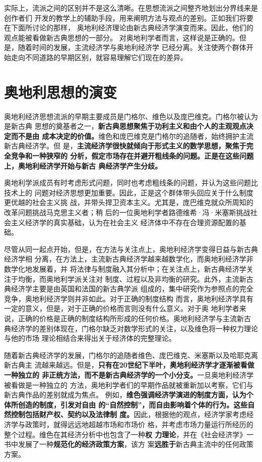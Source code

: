 实际上，流派之间的区别并不是这么清晰。在思想流派之间整齐地划出分界线来是创作者们
开发的教学上的辅助手段，用来阐明方法与观点的差别。正如我们将要在下面所讨论的那样，
奥地利经济理论由新古典经济学演变而来。因此，他们的观点能被看做新古典思想的一部分。
对奥地利学者而言，这样说是正确的。但是，随着时间的发展，主流经济学与奥地利经济学
已经分离。关注使两个群体开始走向不同道路的早期区别，就容易理解它们现在的差异。

\section{奥地利思想的演变}

奥地利经济思想流派的早期主要成员是门格尔、维色以及庞巴维克。门格尔被认为是新古典
思想的奠基者之一，\textbf{新古典思想聚焦于功利主义和由个人的主观观点决定而不是由
  成本决定的价值。}维色和庞巴维克是门格尔的追随者，始终拥护主流新古典经济学。但
是，\textbf{主流经济学很快就倾向于形式主义的数学思想，聚焦于完全竞争和一种狭窄的
  分析，假定市场存在并避开粗线条的问题。正是在这些问题上，奥地利经济学开始与新古
  典经济学产生分歧。}

奥地利学派成员有时考虑形式问题，同时也考虑粗线条的问题，并认为这些问题比技术上的
问题对经济思想更加重要。因此，正是这个群体带头回应关于什么制度更优越的社会主义挑
战，并带头捍卫资本主义。尤其是，庞巴维克就众所周知的改革问题挑战马克思主义者；稍
后的一位奥地利学者路德维希·冯·米塞斯挑战社会主义经济学的真实基础，认为在社会主义
经济体中不存在合理资源配置的基础。

尽管从同一起点开始，但是，在方法与关注点上，奥地利经济学变得日益与新古典经济学相
分离，在方法上，主流新古典经济学越来越数学化，而奥地利经济学非数学化地发展着，并
将法律与制度融入其分析中；在关注点上，新古典经济学关注于均衡，而奥地利学派关注对
制度、过程以及非均衡的研究。此外，主流新古典经济学主要是由英国和法国的新古典学派
组成的，集中研究作为参照点的完全竞争，奥地利经济学则并非如此。对于正确的制度结构
而言，奥地利经济学具有一定的意义，但是，对于正确的价格而言则没有什么意义。对于奥
地利学者来说，正确的价格是正确的制度结构所形成的任何价格。奥地利经济学与主流新古
典经济学的差别体现在，门格尔缺乏对数学形式的关注，以及维色将一种权力理论与他的市场
理论相结合来得出关于经济体的完整理论。

随着新古典经济学的发展，门格尔的追随者维色、庞巴维克、米塞斯以及哈耶克离新古典主
流越来越远。但是，\textbf{只有在20世纪下半叶，奥地利经济学才逐渐被看做一种独立的
  非正统方法，而不是新古典经济学的一个小分支。}一旦奥地利经济学被看做是一种独立的
方法，奥地利学者们的早期作品就被重新加以考察，它们与新古典作品的差别就成为焦点。
例如，\textbf{维色强调经济学演进的制度方面，认为个体所创造的制度，引发对自由
  的“自然控制”，而自由影响着个体的行为。这些自然控制包括财产权、契约以及法律制
  度。}因此，根据他的观点，经济学家考虑经济学与政策时，就得远远地超越市场和市场价
格，并考虑市场力量运行所经历的整个过程。维色在其经济分析中也包含了一种\textbf{权
  力理论}，并在《社会经济学》一书中发展了一种\textbf{规范化的经济政策方案}，该方
案\textbf{远胜于}新古典主流中的任何政策方案。

